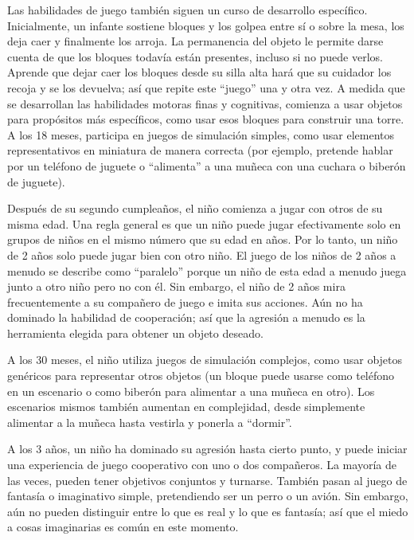 \documentclass[11pt,letterpaper]{report}
\begin{document}
Las habilidades de juego también siguen un curso de desarrollo específico.
Inicialmente, un infante sostiene bloques y los golpea entre sí o sobre la
mesa, los deja caer y finalmente los arroja. La permanencia del objeto le
permite darse cuenta de que los bloques todavía están presentes, incluso si no
puede verlos. Aprende que dejar caer los bloques desde su silla alta hará que
su cuidador los recoja y se los devuelva; así que repite este ``juego'' una y
otra vez. A medida que se desarrollan las habilidades motoras finas y
cognitivas, comienza a usar objetos para propósitos más específicos, como usar
esos bloques para construir una torre. A los 18 meses, participa en juegos de
simulación simples, como usar elementos representativos en miniatura de manera
correcta (por ejemplo, pretende hablar por un teléfono de juguete o ``alimenta''
a una muñeca con una cuchara o biberón de juguete). \cite{Gerber2011}

Después de su segundo cumpleaños, el niño comienza a jugar con otros de su
misma edad. Una regla general es que un niño puede jugar efectivamente solo en
grupos de niños en el mismo número que su edad en años. Por lo tanto, un niño
de 2 años solo puede jugar bien con otro niño. El juego de los niños de 2 años
a menudo se describe como ``paralelo'' porque un niño de esta edad a menudo
juega junto a otro niño pero no con él. Sin embargo, el niño de 2 años mira
frecuentemente a su compañero de juego e imita sus acciones. Aún no ha
dominado la habilidad de cooperación; así que la agresión a menudo es la
herramienta elegida para obtener un objeto deseado. \cite{Gerber2011}

A los 30 meses, el niño utiliza juegos de simulación complejos, como usar
objetos genéricos para representar otros objetos (un bloque puede usarse como
teléfono en un escenario o como biberón para alimentar a una muñeca en otro).
Los escenarios mismos también aumentan en complejidad, desde simplemente
alimentar a la muñeca hasta vestirla y ponerla a ``dormir''. \cite{Gerber2011}

A los 3 años, un niño ha dominado su agresión hasta cierto punto, y puede
iniciar una experiencia de juego cooperativo con uno o dos compañeros. La
mayoría de las veces, pueden tener objetivos conjuntos y turnarse. También
pasan al juego de fantasía o imaginativo simple, pretendiendo ser un perro o un
avión. Sin embargo, aún no pueden distinguir entre lo que es real y lo que es
fantasía; así que el miedo a cosas imaginarias es común en este momento.
\cite{Gerber2011}
\end{document}

